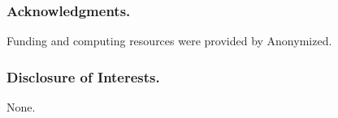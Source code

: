 \documentclass[runningheads]{llncs}
\begin{document}
\begin{credits}
\subsubsection{Acknowledgments.} Funding and computing resources were provided
by Anonymized.

\subsubsection{Disclosure of Interests.} None.
\end{credits}

\clearpage


\end{document}
